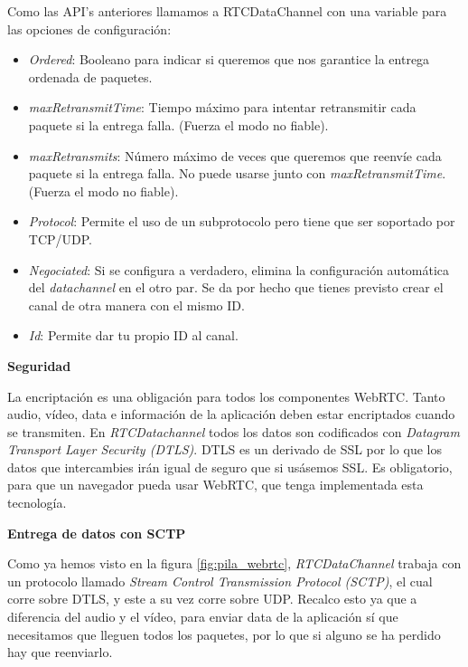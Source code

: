 \noindent Como las API's anteriores llamamos a RTCDataChannel con una variable para las opciones de configuración:

\begin{itemize}
\item \emph{Ordered}: Booleano para indicar si queremos que nos garantice la entrega ordenada de paquetes.
\item \emph{maxRetransmitTime}: Tiempo máximo para intentar retransmitir cada paquete si la entrega falla. (Fuerza el modo no fiable).
\item \emph{maxRetransmits}: Número máximo de veces que queremos que reenvíe cada paquete si la entrega falla. No puede usarse junto con \textit{maxRetransmitTime}. (Fuerza el modo no fiable).
\item \emph{Protocol}: Permite el uso de un subprotocolo pero tiene que ser soportado por TCP/UDP.
\item \emph{Negociated}: Si se configura a verdadero, elimina la configuración automática del \emph{datachannel} en el otro par. Se da por hecho que tienes previsto crear el canal de otra manera con el mismo ID.
\item \emph{Id}: Permite dar tu propio ID al canal.
\end{itemize}

\begin{normalsize}
\noindent \textbf{Seguridad}\\
\end{normalsize}

La encriptación es una obligación para todos los componentes WebRTC. Tanto audio, vídeo, data e información de la aplicación deben estar encriptados cuando se transmiten. En \emph{RTCDatachannel} todos los datos son codificados con \textit{Datagram Transport Layer Security (DTLS)}. DTLS es un derivado de SSL por lo que los datos que intercambies irán igual de seguro que si usásemos SSL. Es obligatorio, para que un navegador pueda usar WebRTC, que tenga implementada esta tecnología.\\


\begin{normalsize}
\noindent \textbf{Entrega de datos con SCTP}\\
\end{normalsize}

Como ya hemos visto en la figura \ref{fig:pila_webrtc}, \emph{RTCDataChannel} trabaja con un protocolo llamado \textit{Stream Control Transmission Protocol (SCTP)}, el cual corre sobre DTLS, y este a su vez corre sobre UDP. Recalco esto ya que a diferencia del audio y el vídeo, para enviar data de la aplicación sí que necesitamos que lleguen todos los paquetes, por lo que si alguno se ha perdido hay que reenviarlo.\\

